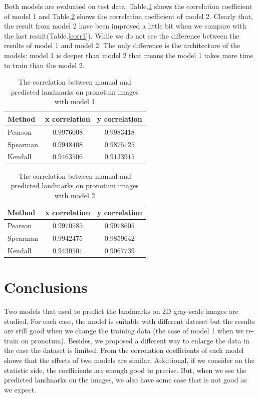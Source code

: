 \documentclass[12pt,a4paper]{article}
\begin{document}
Both models are evaluated on test data. Table.\ref{coffcelia} shows the correlation coefficient of model 1 and Table.\ref{coffdropout} shows the correlation coefficient of model 2. Clearly that, the result from model 2 have been improved a little bit when we compare with the last result(Table.\ref{corr1}). While we do not see the difference between the results of model 1 and model 2. The only difference is the architecture of the models: model 1 is deeper than model 2 that means the model 1 takes more time to train than the model 2.
\begin{table}[h!]
	\centering
	\begin{tabular}{l c c}
		Method & x correlation & y correlation \\ \hline
		Pearson & $0.9976008$ & $0.9983418$ \\ \hline
		Spearman & $0.9948408$ & $0.9875125$ \\ \hline
		Kendall & $0.9463506$ & $0.9133915$ \\ \hline
	\end{tabular}
	\caption{The correlation between manual and predicted landmarks on pronotum images with model 1}
	\label{coffcelia}
\end{table}
\begin{table}[h!]
	\centering
	\begin{tabular}{l c c}
		Method & x correlation & y correlation \\ \hline
		Pearson & $0.9970585$ & $0.9978605$ \\ \hline
		Spearman & $0.9942475$ & $0.9859642$ \\ \hline
		Kendall & $0.9430501$ & $0.9067739$ \\ \hline
	\end{tabular}
	\caption{The correlation between manual and predicted landmarks on pronotum images with model 2}
	\label{coffdropout}
\end{table}
\section{Conclusions}
Two models that used to predict the landmarks on 2D gray-scale images are studied. For each case, the model is suitable with different dataset but the results are still good when we change the training data (the case of model 1 when we re-train on pronotum). Besides, we proposed a different way to enlarge the data in the case the dataset is limited. From the correlation coefficients of each model shows that the effects of two models are similar. Additional, if we consider on the statistic side, the coefficients are enough good to precise. But, when we see the predicted landmarks on the images, we also have some case that is not good as we expect. 


\end{document}
